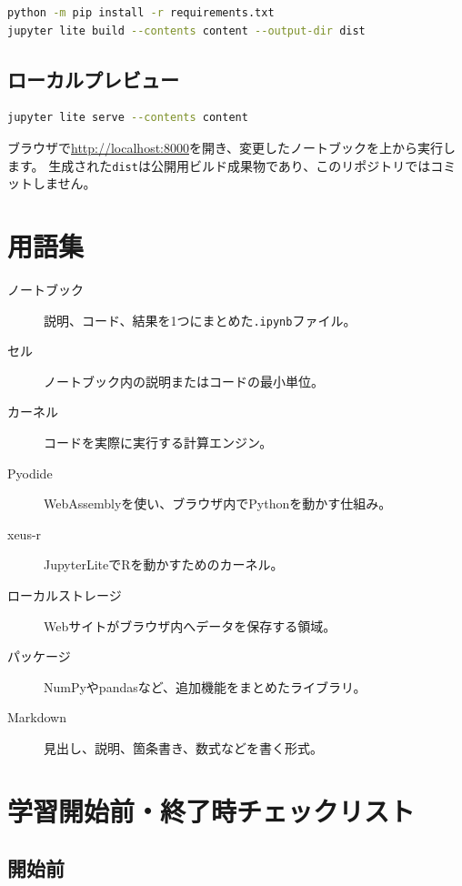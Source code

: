 \documentclass[a4paper,11pt]{ltjsarticle}
\newcommand{\filepath}[1]{\nolinkurl{#1}}
\begin{document}
\begin{lstlisting}[language=bash]
python -m pip install -r requirements.txt
jupyter lite build --contents content --output-dir dist
\end{lstlisting}

\subsection{ローカルプレビュー}

\begin{lstlisting}[language=bash]
jupyter lite serve --contents content
\end{lstlisting}

ブラウザで\url{http://localhost:8000}を開き、変更したノートブックを上から実行します。
生成された\filepath{dist}は公開用ビルド成果物であり、このリポジトリではコミットしません。

\section{用語集}

\begin{description}
  \item[ノートブック] 説明、コード、結果を1つにまとめた\texttt{.ipynb}ファイル。
  \item[セル] ノートブック内の説明またはコードの最小単位。
  \item[カーネル] コードを実際に実行する計算エンジン。
  \item[Pyodide] WebAssemblyを使い、ブラウザ内でPythonを動かす仕組み。
  \item[xeus-r] JupyterLiteでRを動かすためのカーネル。
  \item[ローカルストレージ] Webサイトがブラウザ内へデータを保存する領域。
  \item[パッケージ] NumPyやpandasなど、追加機能をまとめたライブラリ。
  \item[Markdown] 見出し、説明、箇条書き、数式などを書く形式。
\end{description}

\section{学習開始前・終了時チェックリスト}

\subsection{開始前}
\end{document}
